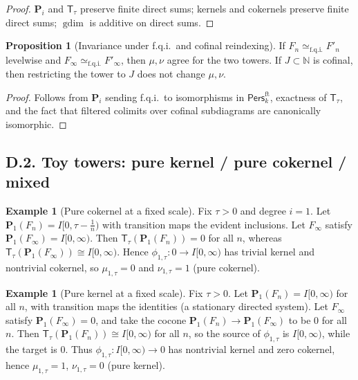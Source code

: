 \documentclass[11pt]{article}
\numberwithin{equation}{section}
\theoremstyle{plain}
\theoremstyle{definition}
\theoremstyle{remark}
\DeclareMathOperator{\gdim}{gdim}
\newcommand{\Pers}{\mathsf{Pers}}
\newcommand{\T}{\mathsf{T}}
\theoremstyle{plain}
\theoremstyle{definition}
\numberwithin{equation}{section}
\newtheorem{proposition}[theorem]{Proposition}
\theoremstyle{definition}
\newtheorem{example}[theorem]{Example}
\numberwithin{equation}{section}
\theoremstyle{plain}
\theoremstyle{definition}
\theoremstyle{remark}
\newcommand{\NN}{\mathbb{N}}
\newcommand{\Pfun}{\mathbf{P}}
\begin{document}
\begin{proof}
\(\Pfun_i\) and \(\T_\tau\) preserve finite direct sums; kernels and cokernels preserve finite direct sums; \(\gdim\) is additive on direct sums.
\end{proof}

\begin{proposition}[Invariance under f.q.i.\ and cofinal reindexing]\label{prop:D-invariance}
If \(F_n\simeq_{\mathrm{f.q.i.}}F'_n\) levelwise and \(F_\infty\simeq_{\mathrm{f.q.i.}}F'_\infty\), then \(\mu,\nu\) agree for the two towers.
If \(J\subset \NN\) is cofinal, then restricting the tower to \(J\) does not change \(\mu,\nu\).
\end{proposition}

\begin{proof}
Follows from \(\Pfun_i\) sending f.q.i.\ to isomorphisms in \(\Pers^{\mathrm{ft}}_k\), exactness of \(\T_\tau\), and the fact that filtered colimits over cofinal subdiagrams are canonically isomorphic.
\end{proof}

\subsection*{D.2. Toy towers: pure kernel / pure cokernel / mixed}

\begin{example}[Pure cokernel at a fixed scale]\label{D:ex:pure-coker}
Fix \(\tau>0\) and degree \(i=1\).
Let \(\Pfun_1(F_n)=I[0,\tau-\tfrac1n)\) with transition maps the evident inclusions.
Let \(F_\infty\) satisfy \(\Pfun_1(F_\infty)=I[0,\infty)\).
Then \(\T_\tau(\Pfun_1(F_n))=0\) for all \(n\), whereas \(\T_\tau(\Pfun_1(F_\infty))\cong I[0,\infty)\).
Hence \(\phi_{1,\tau}:0\to I[0,\infty)\) has trivial kernel and nontrivial cokernel, so \(\mu_{1,\tau}=0\) and \(\nu_{1,\tau}=1\) (pure cokernel).
\end{example}

\begin{example}[Pure kernel at a fixed scale]\label{D:ex:pure-ker}
Fix \(\tau>0\).
Let \(\Pfun_1(F_n)=I[0,\infty)\) for all \(n\), with transition maps the identities (a stationary directed system).
Let \(F_\infty\) satisfy \(\Pfun_1(F_\infty)=0\), and take the cocone \(\Pfun_1(F_n)\to \Pfun_1(F_\infty)\) to be \(0\) for all \(n\).
Then \(\T_\tau(\Pfun_1(F_n))\cong I[0,\infty)\) for all \(n\), so the source of \(\phi_{1,\tau}\) is \(I[0,\infty)\), while the target is \(0\).
Thus \(\phi_{1,\tau}: I[0,\infty)\to 0\) has nontrivial kernel and zero cokernel, hence \(\mu_{1,\tau}=1\), \(\nu_{1,\tau}=0\) (pure kernel).
\end{example}
\end{document}
